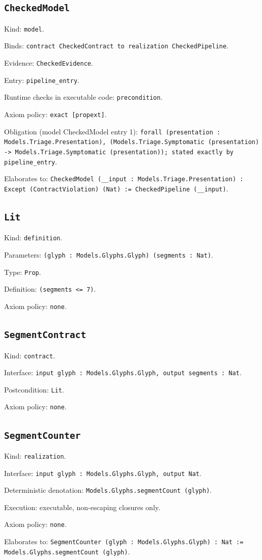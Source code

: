 \documentclass[11pt]{article}
\begin{document}
\subsection*{\texttt{CheckedModel}}
\noindent Kind: \texttt{model}.\par
\noindent Binds: \texttt{contract CheckedContract to realization CheckedPipeline}.\par
\noindent Evidence: \texttt{CheckedEvidence}.\par
\noindent Entry: \texttt{pipeline\_entry}.\par
\noindent Runtime checks in executable code: \texttt{precondition}.\par
\noindent Axiom policy: \texttt{exact [propext]}.\par
\noindent Obligation (model CheckedModel entry 1): \texttt{forall (presentation : Models.Triage.Presentation), (Models.Triage.Symptomatic (presentation) -> Models.Triage.Symptomatic (presentation)); stated exactly by pipeline\_entry}.\par
\noindent Elaborates to: \texttt{CheckedModel (\_\_input : Models.Triage.Presentation) : Except (ContractViolation) (Nat) := CheckedPipeline (\_\_input)}.\par
\subsection*{\texttt{Lit}}
\noindent Kind: \texttt{definition}.\par
\noindent Parameters: \texttt{(glyph : Models.Glyphs.Glyph) (segments : Nat)}.\par
\noindent Type: \texttt{Prop}.\par
\noindent Definition: \texttt{(segments <= 7)}.\par
\noindent Axiom policy: \texttt{none}.\par
\subsection*{\texttt{SegmentContract}}
\noindent Kind: \texttt{contract}.\par
\noindent Interface: \texttt{input glyph : Models.Glyphs.Glyph, output segments : Nat}.\par
\noindent Postcondition: \texttt{Lit}.\par
\noindent Axiom policy: \texttt{none}.\par
\subsection*{\texttt{SegmentCounter}}
\noindent Kind: \texttt{realization}.\par
\noindent Interface: \texttt{input glyph : Models.Glyphs.Glyph, output Nat}.\par
\noindent Deterministic denotation: \texttt{Models.Glyphs.segmentCount (glyph)}.\par
\noindent Execution: executable, non-escaping closures only.\par
\noindent Axiom policy: \texttt{none}.\par
\noindent Elaborates to: \texttt{SegmentCounter (glyph : Models.Glyphs.Glyph) : Nat := Models.Glyphs.segmentCount (glyph)}.\par
\end{document}

